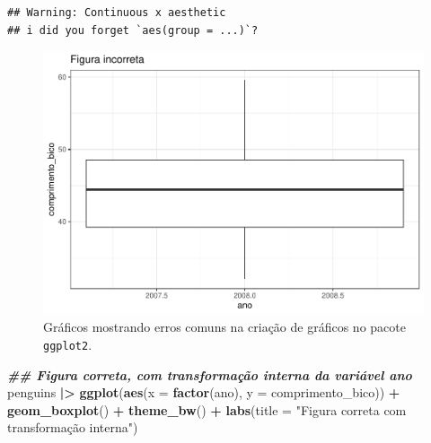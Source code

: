 \documentclass[
]{article}
\newenvironment{Shaded}{\begin{snugshade}}{\end{snugshade}}
\newcommand{\AttributeTok}[1]{\textcolor[rgb]{0.13,0.29,0.53}{#1}}
\newcommand{\DocumentationTok}[1]{\textcolor[rgb]{0.56,0.35,0.01}{\textbf{\textit{#1}}}}
\newcommand{\FunctionTok}[1]{\textcolor[rgb]{0.13,0.29,0.53}{\textbf{#1}}}
\newcommand{\NormalTok}[1]{#1}
\newcommand{\SpecialCharTok}[1]{\textcolor[rgb]{0.81,0.36,0.00}{\textbf{#1}}}
\newcommand{\StringTok}[1]{\textcolor[rgb]{0.31,0.60,0.02}{#1}}
\begin{document}
\begin{verbatim}
## Warning: Continuous x aesthetic
## i did you forget `aes(group = ...)`?
\end{verbatim}

\begin{figure}
\centering
\includegraphics{epr_files/figure-latex/fig-plot-error-1.pdf}
\caption{\label{fig:fig-plot-error-1}Gráficos mostrando erros comuns na criação de gráficos no pacote \texttt{ggplot2}.}
\end{figure}

\begin{Shaded}
\begin{Highlighting}[]
\DocumentationTok{\#\# Figura correta, com transformação interna da variável ano}
\NormalTok{penguins }\SpecialCharTok{|\textgreater{}}
    \FunctionTok{ggplot}\NormalTok{(}\FunctionTok{aes}\NormalTok{(}\AttributeTok{x =} \FunctionTok{factor}\NormalTok{(ano), }\AttributeTok{y =}\NormalTok{ comprimento\_bico)) }\SpecialCharTok{+}
    \FunctionTok{geom\_boxplot}\NormalTok{() }\SpecialCharTok{+} 
    \FunctionTok{theme\_bw}\NormalTok{() }\SpecialCharTok{+}
    \FunctionTok{labs}\NormalTok{(}\AttributeTok{title =} \StringTok{"Figura correta com transformação interna"}\NormalTok{)}
\end{Highlighting}
\end{Shaded}
\end{document}
